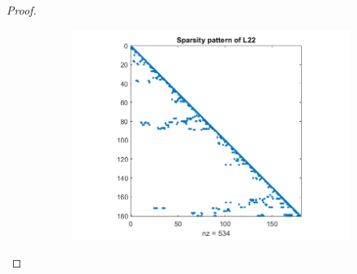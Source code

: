 \documentclass[12pt]{report}
\begin{document}
\begin{problem}
\begin{proof}
\begin{figure}[H]
\begin{subfigure}[b]{0.5\linewidth}
    \caption{}
    \label{fig1:c}
    \vspace{4ex}
  \end{subfigure}%
  \begin{subfigure}[b]{0.5\linewidth}
    \centering
    \includegraphics[width=\linewidth]{L22.png}
    \caption{}
    \label{fig1:d}
    \vspace{4ex}
  \end{subfigure}
  \caption{}
  \label{fig1}
\end{figure}


\end{proof}
\end{problem}
\end{document}
